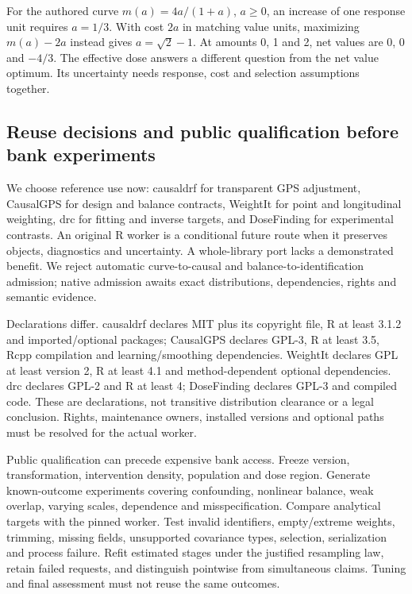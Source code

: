 For the authored curve $m(a)=4a/(1+a)$, $a\geq0$, an increase of one response
unit requires $a=1/3$. With cost $2a$ in matching value units, maximizing
$m(a)-2a$ instead gives $a=\sqrt2-1$. At amounts 0, 1 and 2, net values are
0, 0 and $-4/3$. The effective dose answers a different question from the net
value optimum. Its uncertainty needs response, cost and selection assumptions
together.~\citep{exec24_dose_contract}

\subsection{Reuse decisions and public qualification before bank experiments}
We choose reference use now: causaldrf for transparent GPS adjustment,
CausalGPS for design and balance contracts, WeightIt for point and longitudinal
weighting, drc for fitting and inverse targets, and DoseFinding for experimental
contrasts. An original R worker is a conditional future route when it preserves
objects, diagnostics and uncertainty. A whole-library port lacks a demonstrated
benefit. We reject automatic curve-to-causal and balance-to-identification
admission; native admission awaits exact distributions, dependencies, rights
and semantic evidence.~\citep{exec24_dose_contract}

Declarations differ. causaldrf declares MIT plus its copyright file, R at least
3.1.2 and imported/optional packages; CausalGPS declares GPL-3, R at least 3.5,
Rcpp compilation and learning/smoothing dependencies. WeightIt declares GPL
at least version 2, R at least 4.1 and method-dependent optional dependencies.
drc declares GPL-2 and R at least 4; DoseFinding declares GPL-3 and compiled
code. These are declarations, not transitive distribution clearance or a legal
conclusion. Rights, maintenance owners, installed versions and optional paths
must be resolved for the actual worker.
\citep{exec24_dose_causaldrf,exec24_dose_causalgps,exec24_dose_weightit,exec24_dose_drc,exec24_dose_dosefinding}

Public qualification can precede expensive bank access. Freeze version,
transformation, intervention density, population and dose region. Generate
known-outcome experiments covering confounding, nonlinear balance, weak overlap,
varying scales, dependence and misspecification. Compare analytical targets with
the pinned worker. Test invalid identifiers, empty/extreme weights, trimming,
missing fields, unsupported covariance types, selection, serialization and
process failure. Refit estimated stages under the justified resampling law,
retain failed requests, and distinguish pointwise from simultaneous claims.
Tuning and final assessment must not reuse the same outcomes.
\citep{exec24_dose_contract}

